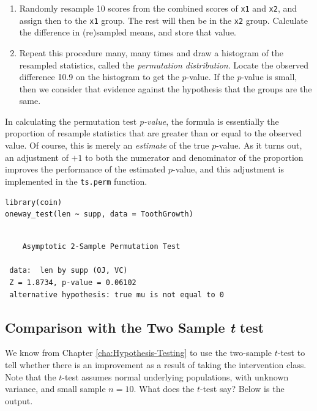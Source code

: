 \documentclass[captions=tableheading]{scrbook}
\begin{document}
\begin{example}
\begin{enumerate}
\item Randomly resample 10 scores from the combined scores of \texttt{x1} and \texttt{x2}, and assign then to the \texttt{x1} group. The rest will then be in the \texttt{x2} group. Calculate the difference in (re)sampled means, and store that value.
\item Repeat this procedure many, many times and draw a histogram of the resampled statistics, called the \emph{permutation distribution}. Locate the observed difference 10.9 on the histogram to get the \(p\)-value. If the \(p\)-value is small, then we consider that evidence against the hypothesis that the groups are the same.
\end{enumerate}

\end{example}

\begin{rem}
In calculating the permutation test \emph{p-value}, the formula is essentially the proportion of resample statistics that are greater than or equal to the observed value. Of course, this is merely an \emph{estimate} of the true \(p\)-value. As it turns out, an adjustment of \(+1\) to both the numerator and denominator of the proportion improves the performance of the estimated \(p\)-value, and this adjustment is implemented in the \texttt{ts.perm} function.
\end{rem}


\begin{verbatim}
library(coin)
oneway_test(len ~ supp, data = ToothGrowth)
\end{verbatim}

\begin{verbatim}
 
 	Asymptotic 2-Sample Permutation Test
 
 data:  len by supp (OJ, VC) 
 Z = 1.8734, p-value = 0.06102
 alternative hypothesis: true mu is not equal to 0
\end{verbatim}
\subsection{Comparison with the Two Sample \emph{t} test}
\label{sec-13-4-1}


We know from Chapter \ref{cha:Hypothesis-Testing} to use the two-sample \(t\)-test to tell whether there is an improvement as a result of taking the intervention class. Note that the \(t\)-test assumes normal underlying populations, with unknown variance, and small sample \(n=10\). What does the \(t\)-test say? Below is the output. 
\end{document}
